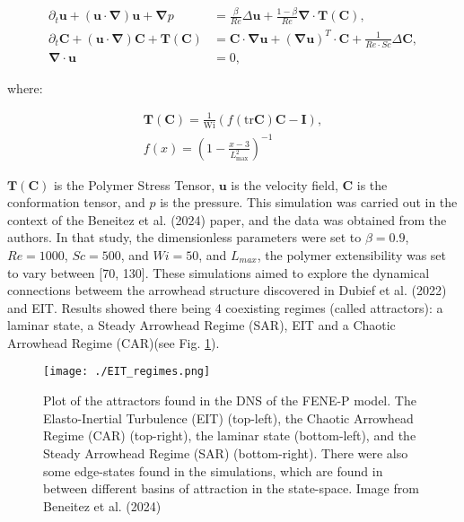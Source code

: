 \documentclass[12pt]{report} %
\begin{document}
\begin{equation}
  \begin{aligned}
    \partial_t \mathbf{u} + (\mathbf{u} \cdot \mathbf{\nabla}) \mathbf{u} + \mathbf{\nabla} p &= \frac{\beta}{Re} \Delta \mathbf{u} + \frac{1 - \beta}{Re} \mathbf{\nabla} \cdot \mathbf{T}(\mathbf{C}), \\
    \partial_t \mathbf{C} + (\mathbf{u} \cdot \mathbf{\nabla}) \mathbf{C} + \mathbf{T}(\mathbf{C}) &= \mathbf{C} \cdot \mathbf{\nabla} \mathbf{u} + (\mathbf{\nabla} \mathbf{u})^T \cdot \mathbf{C} + \frac{1}{Re \cdot Sc} \Delta \mathbf{C}, \\
    \mathbf{\nabla} \cdot \mathbf{u} &= 0,
  \end{aligned}
\end{equation}

where:

\begin{equation}
  \begin{aligned}
    \mathbf{T}(\mathbf{C}) = \frac{1}{\text{Wi}} \left(f(\text{tr}\mathbf{C})\mathbf{C} - \mathbf{I}\right), \\
    f(x) = \left(1 - \frac{x - 3}{L_{\text{max}}^2}\right)^{-1}
  \end{aligned}
\end{equation}

$\mathbf{T}(\mathbf{C})$ is the Polymer Stress Tensor, $\mathbf{u}$ is the velocity field, $\mathbf{C}$ is the conformation tensor, and $p$ is the pressure. This simulation was carried out in the context of the Beneitez et al. (2024) paper\cite{beneitez2024multistability}, and the data was obtained from the authors. In that study, the dimensionless parameters were set to $\beta = 0.9$, $Re = 1000$, $Sc = 500$, and $Wi = 50$, and $L_{max}$, the polymer extensibility was set to vary between [70, 130]. These simulations aimed to explore the dynamical connections betweem the arrowhead structure discovered in Dubief et al. (2022)\cite{dubief2022first} and EIT. Results showed there being 4 coexisting regimes (called attractors): a laminar state, a Steady Arrowhead Regime (SAR), EIT and a Chaotic Arrowhead Regime (CAR)(see Fig. \ref{fig:attractors}).

\begin{figure}
  \centering
  \texttt{[image: ./EIT\_regimes.png]}
  \caption{Plot of the attractors found in the DNS of the FENE-P model. The Elasto-Inertial Turbulence (EIT) (top-left), the Chaotic Arrowhead Regime (CAR) (top-right), the laminar state (bottom-left), and the Steady Arrowhead Regime (SAR) (bottom-right). There were also some edge-states found in the simulations, which are found in between different basins of attraction in the state-space. Image from Beneitez et al. (2024)\cite{beneitez2024multistability}}
  \label{fig:attractors}
\end{figure}
\end{document}
